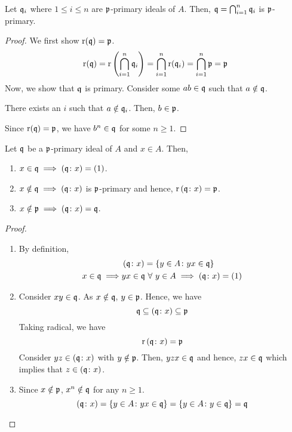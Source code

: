 \begin{lemma}{}{}
\label{lemma:4_3}
	Let \(\mathfrak{q}_i\) where \(1 \leq i \leq n\) are \(\mathfrak{p}\)-primary ideals
	of \(A\).
	Then, \(\mathfrak{q} = \bigcap_{i = 1}^{n} \mathfrak{q}_i\) is \(\mathfrak{p}\)-primary.
\end{lemma}
\begin{proof}
	We first show \(\operatorname{r}(\mathfrak{q}) = \mathfrak{p}\).
	\[
		\operatorname{r}(\mathfrak{q}) = \operatorname{r} \left( \bigcap_{i = 1}^{n} \mathfrak{q}_i \right) =
		\bigcap_{i = 1}^{n} \operatorname{r}(\mathfrak{q}_i) = \bigcap_{i = 1}^{n} \mathfrak{p}
		= \mathfrak{p}
	\]
	Now, we show that \(\mathfrak{q}\) is primary.
	Consider some \(ab \in \mathfrak{q}\) such that \(a \notin \mathfrak{q}\).

	There exists an \(i\) such that \(a \notin \mathfrak{q}_i\).
	Then, \(b \in \mathfrak{p}\).

	Since \(\operatorname{r}(\mathfrak{q}) = \mathfrak{p}\), we have \(b^n \in \mathfrak{q}\)
	for some \(n \geq 1\).
\end{proof}


\begin{lemma}{}{}
\label{lemma:4_4}
	Let \(\mathfrak{q}\) be a \(\mathfrak{p}\)-primary ideal of \(A\) and \(x \in A\).
	Then,
	\begin{enumerate}
		\item \(x \in \mathfrak{q} \implies \left( \mathfrak{q} \colon x \right) = (1)\).
		\item \(x \notin \mathfrak{q} \implies \left( \mathfrak{q} \colon x \right)\) is
			\(\mathfrak{p}\)-primary and hence, \(\operatorname{r}\left( \mathfrak{q} \colon x \right) = \mathfrak{p}\).
		\item \(x \notin \mathfrak{p} \implies \left( \mathfrak{q} \colon x \right)  = \mathfrak{q}\).
	\end{enumerate}
\end{lemma}
\begin{proof}
	\begin{enumerate}
		\item By definition,
		\begin{align*}
			& \left( \mathfrak{q} \colon x \right) = \left\{ y \in A \colon yx \in \mathfrak{q} \right\} \\
			x \in \mathfrak{q} \implies & yx \in \mathfrak{q} \ \forall\ y \in A \implies
			\left( \mathfrak{q} \colon x \right) = \left( 1 \right)
		\end{align*}

		\item Consider \(xy \in \mathfrak{q}\).
		As \(x \notin \mathfrak{q}\), \(y \in \mathfrak{p}\).
		Hence, we have
		\[
			\mathfrak{q} \subseteq \left( \mathfrak{q} \colon x \right) \subseteq \mathfrak{p}
		\]
		Taking radical, we have
		\[
			\operatorname{r}\left( \mathfrak{q} \colon x \right) = \mathfrak{p}
		\]
		Consider \(yz \in \left( \mathfrak{q} \colon x \right)\) with \(y \notin \mathfrak{p}\).
		Then, \(yzx \in \mathfrak{q}\) and hence, \(zx \in \mathfrak{q}\) which implies
		that \(z \in \left( \mathfrak{q} \colon x \right)\).

		\item Since \(x \notin \mathfrak{p}\), \(x^n \notin \mathfrak{q}\) for any
		\(n \geq 1\).
		\[
			\left( \mathfrak{q} \colon x \right) = \left\{ y \in A \colon yx \in \mathfrak{q} \right\} =
			\left\{ y \in A \colon y \in \mathfrak{q} \right\} = \mathfrak{q}
		\]
	\end{enumerate}
\end{proof}

